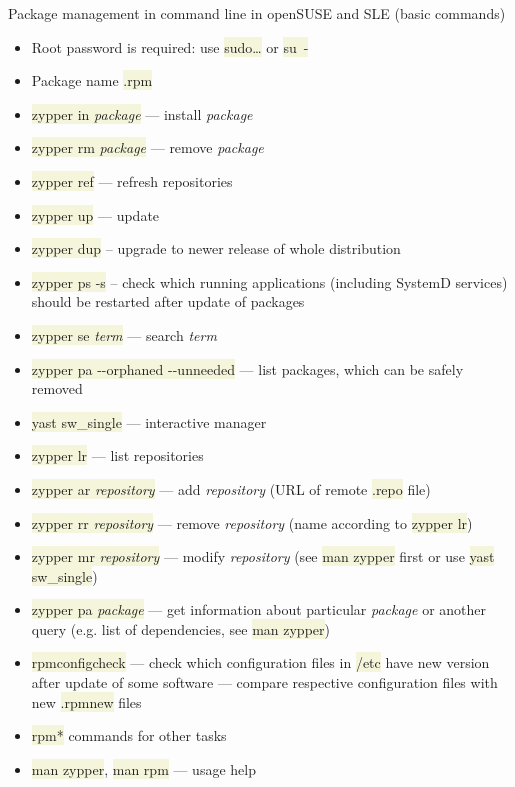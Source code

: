 \documentclass[compress, ucs, xelatex, 11pt, xcolor=svgnames, aspectratio=169,
	hyperref={
		bookmarks=true,
		unicode=true,
		colorlinks=true,
		pdftitle={Linux, command line and MetaCentrum},
		plainpages=false,
		pdfauthor={Vojtech Zeisek},
		pdfsubject={Course about use of Linux command line, writing shell scripts and using MetaCentrum of CESNET},
		pdfcreator={XeLaTeX},
		pdfkeywords={Linux, GNU, BASH, shell, command line, MetaCentrum},
		linkcolor=DarkRed, %
		anchorcolor=DarkBlue, %
		citecolor=Indigo, %
		filecolor=NavyBlue, %
		menucolor=DarkMagenta, %
		urlcolor=DarkBlue, %
		pdftex},
	url={hyphens, lowtilde} %
	]{beamer}
\renewcommand{\texttt}[1]{\colorbox{Beige}{{\ttfamily #1}}}
\begin{document}
\begin{frame}[allowframebreaks]{Package management in command line in openSUSE and SLE (basic commands)}
	\begin{itemize}
		\item Root password is required: use \texttt{sudo\ldots} or \texttt{su~-}
		\item Package name \texttt{*.rpm}
		\item \texttt{zypper in \textit{package}} --- install \textit{package}
		\item \texttt{zypper rm \textit{package}} --- remove \textit{package}
		\item \texttt{zypper ref} --- refresh repositories
		\item \texttt{zypper up} --- update
		\item \texttt{zypper dup} -- upgrade to newer release of whole distribution
		\item \texttt{zypper ps -s} -- check which running applications (including SystemD services) should be restarted after update of packages
		\item \texttt{zypper se \textit{term}} --- search \textit{term}
		\item \texttt{zypper pa -{-}orphaned -{-}unneeded} --- list packages, which can be safely removed
		\item \texttt{yast sw\_single} --- interactive manager
		\item \texttt{zypper lr} --- list repositories
		\item \texttt{zypper ar \textit{repository}} --- add \textit{repository} (URL of remote \texttt{*.repo} file)
		\item \texttt{zypper rr \textit{repository}} --- remove \textit{repository} (name according to \texttt{zypper lr})
		\item \texttt{zypper mr \textit{repository}} --- modify \textit{repository} (see \texttt{man zypper} first or use \texttt{yast sw\_single})
		\item \texttt{zypper pa \textit{package}} --- get information about particular \textit{package} or another query (e.g. list of dependencies, see \texttt{man zypper})
		\item \texttt{rpmconfigcheck} --- check which configuration files in \texttt{/etc} have new version after update of some software --- compare respective configuration files with new \texttt{*.rpmnew} files
		\item \texttt{rpm*} commands for other tasks
		\item \texttt{man zypper}, \texttt{man rpm} --- usage help
	\end{itemize}
\end{frame}
\end{document}
